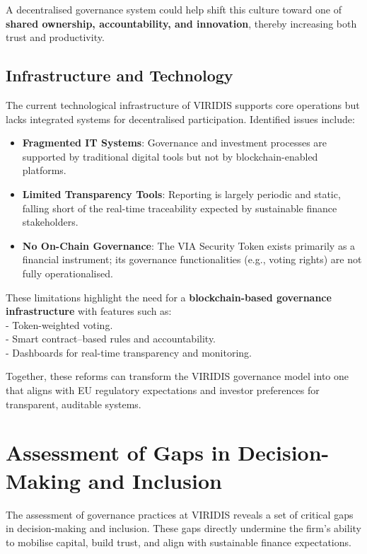 \documentclass[
  english,
  12pt,
  oneside,
  open=any]{scrbook}
\providecommand{\tightlist}{%
  \setlength{\itemsep}{0pt}\setlength{\parskip}{0pt}}\usepackage{longtable,booktabs,array}
\begin{document}
A decentralised governance system could help shift this culture toward
one of \textbf{shared ownership, accountability, and innovation},
thereby increasing both trust and productivity.

\subsection{Infrastructure and Technology}\label{sec-it}

The current technological infrastructure of VIRIDIS supports core
operations but lacks integrated systems for decentralised participation.
Identified issues include:

\begin{itemize}
\tightlist
\item
  \textbf{Fragmented IT Systems}: Governance and investment processes
  are supported by traditional digital tools but not by
  blockchain-enabled platforms.\\
\item
  \textbf{Limited Transparency Tools}: Reporting is largely periodic and
  static, falling short of the real-time traceability expected by
  sustainable finance stakeholders.\\
\item
  \textbf{No On-Chain Governance}: The VIA Security Token exists
  primarily as a financial instrument; its governance functionalities
  (e.g., voting rights) are not fully operationalised.
\end{itemize}

These limitations highlight the need for a \textbf{blockchain-based
governance infrastructure} with features such as:\\
- Token-weighted voting.\\
- Smart contract--based rules and accountability.\\
- Dashboards for real-time transparency and monitoring.

Together, these reforms can transform the VIRIDIS governance model into
one that aligns with EU regulatory expectations and investor preferences
for transparent, auditable systems.

\section{Assessment of Gaps in Decision-Making and
Inclusion}\label{sec-gaps}

The assessment of governance practices at VIRIDIS reveals a set of
critical gaps in decision-making and inclusion. These gaps directly
undermine the firm's ability to mobilise capital, build trust, and align
with sustainable finance expectations.
\end{document}
